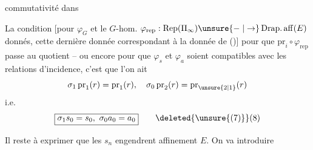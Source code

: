 commutativité dans

La condition [pour $\varphi_G$  et le $G$-hom.
$\varphi_{\mathrm{rep}}:\operatorname{Rep}(\Pi_\infty)\unsure{\relbar|\to}\operatorname{Drap.aff}(E)$ donnés, cette
dernière donnée correspondant à la donnée
de ()] pour que $\mathrm{pr}_i\circ\varphi_{\mathrm{rep}}$ passe au quotient 
-- ou encore pour que $\varphi_s$ et $\varphi_a$ soient
compatibles avec les relations d'incidence,
c'est que l'on ait
\[ \sigma_1\,\mathrm{pr}_1(r)=\mathrm{pr}_1(r),\quad \sigma_0\,\mathrm{pr}_2(r)=\mathrm{pr}_{\unsure{2|1}}(r) \]
i.e.
\[ \boxed{\sigma_1s_0=s_0,\ \sigma_0a_0=a_0} \tag*{\deleted{\unsure{(7)}}(8)} \]

Il reste à exprimer que les $s_n$ engendrent
affinement $E$. On va introduire
